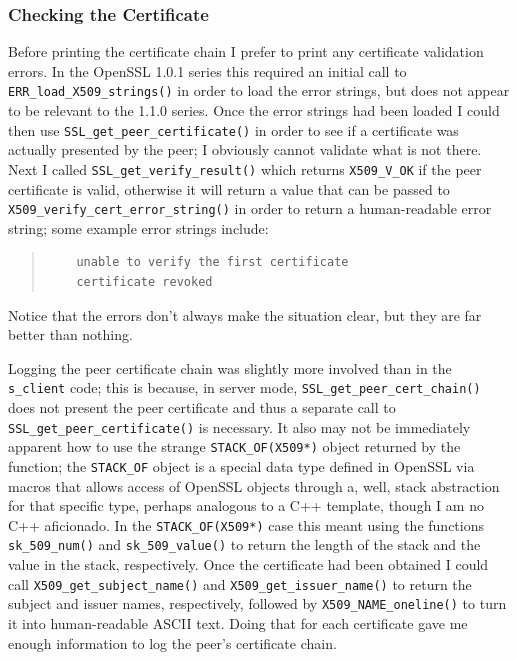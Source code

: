 \documentclass{article}
\begin{document}
\subsubsection{Checking the Certificate}
Before printing the certificate chain I prefer to print any certificate validation errors.  In the OpenSSL 1.0.1 series this required an initial call to \texttt{ERR_load_X509_strings()} in order to load the error strings, but does not appear to be relevant to the 1.1.0 series.  Once the error strings had been loaded I could then use \texttt{SSL_get_peer_certificate()} in order to see if a certificate was actually presented by the peer; I obviously cannot validate what is not there.  Next I called \texttt{SSL_get_verify_result()} which returns \texttt{X509_V_OK} if the peer certificate is valid, otherwise it will return a value that can be passed to \texttt{X509_verify_cert_error_string()} in order to return a human-readable error string; some example error strings include:

\begin{quote}
\begin{verbatim}
	unable to verify the first certificate
	certificate revoked
\end{verbatim}
\end{quote}

Notice that the errors don't always make the situation clear, but they are far better than nothing.

Logging the peer certificate chain was slightly more involved than in the \texttt{s_client} code; this is because, in server mode, \texttt{SSL_get_peer_cert_chain()} does not present the peer certificate and thus a separate call to \texttt{SSL_get_peer_certificate()} is necessary. It also may not be immediately apparent how to use the strange \texttt{STACK_OF(X509*)} object returned by the function; the \texttt{STACK_OF} object is a special data type defined in OpenSSL via macros that allows access of OpenSSL objects through a, well, stack abstraction for that specific type, perhaps analogous to a C++ template, though I am no C++ aficionado.  In the \texttt{STACK_OF(X509*)} case this meant using the functions \texttt{sk_509_num()} and \texttt{sk_509_value()} to return the length of the stack and the value in the stack, respectively.  Once the certificate had been obtained I could call \texttt{X509_get_subject_name()} and \texttt{X509_get_issuer_name()} to return the subject and issuer names, respectively, followed by \texttt{X509_NAME_oneline()} to turn it into human-readable ASCII text.  Doing that for each certificate gave me enough information to log the peer's certificate chain.
\end{document}
